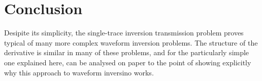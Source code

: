 \section{Conclusion}
Desipite its simplicity, the single-trace inversion transmission problem proves typical of many more complex waveform inversion problems. The structure of the derivative is similar in many of these problems, and for the particularly simple one explained here, can be analysed on paper to the point of showing explicitly why this approach to waveform inversino works.







